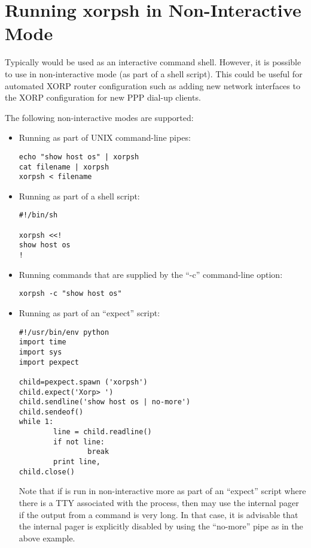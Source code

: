 \section{Running xorpsh in Non-Interactive Mode}
\label{xorpsh:non-interactive-mode}

Typically \xorpsh would be used as an interactive command shell.
However, it is possible to use \xorpsh in non-interactive mode
(\eg as part of a shell script). This could be useful for automated
XORP router configuration such as adding new network interfaces
to the XORP configuration for new PPP dial-up clients.

The following non-interactive modes are supported:

\begin{itemize}

  \item Running \xorpsh as part of UNIX command-line pipes:

\begin{verbatim}
echo "show host os" | xorpsh
cat filename | xorpsh
xorpsh < filename
\end{verbatim}

  \item Running \xorpsh as part of a shell script:

\begin{verbatim}
#!/bin/sh

xorpsh <<!
show host os
!
\end{verbatim}

  \item Running commands that are supplied by the ``-c'' \xorpsh
   command-line option:

\begin{verbatim}
xorpsh -c "show host os"
\end{verbatim}

  \item Running \xorpsh as part of an ``expect'' script:

\begin{verbatim}
#!/usr/bin/env python
import time
import sys
import pexpect

child=pexpect.spawn ('xorpsh')
child.expect('Xorp> ')
child.sendline('show host os | no-more')
child.sendeof()
while 1:
        line = child.readline()
        if not line:
                break
        print line,
child.close()
\end{verbatim}

Note that if \xorpsh is run in non-interactive more as part of an ``expect''
script where there is a TTY associated with the \xorpsh process, then
\xorpsh may use the internal pager if the output from a command is very long.
In that case, it is advisable that the internal pager is explicitly disabled
by using the ``no-more'' pipe as in the above example.

\end{itemize}

